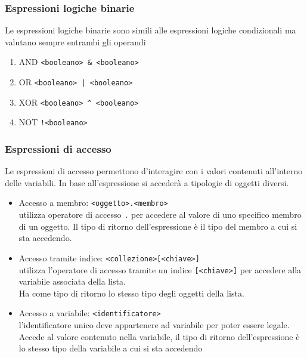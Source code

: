 \subsubsection{Espressioni logiche binarie}
Le espressioni logiche binarie sono simili alle espressioni logiche condizionali ma valutano sempre
entrambi gli operandi
\begin{enumerate}
    \item AND \lstinline|<booleano> & <booleano>|
    \item OR \lstinline=<booleano> | <booleano>=
    \item XOR \lstinline|<booleano> ^ <booleano>|
    \item NOT \lstinline|!<booleano>|
\end{enumerate}

\subsubsection{Espressioni di accesso}
Le espressioni di accesso permettono d'interagire con i valori contenuti all'interno delle variabili.
In base all'espressione si accederà a tipologie di oggetti diversi.

\begin{itemize}
    \item 
    {
        Accesso a membro: \lstinline|<oggetto>.<membro>| \\ 
        utilizza operatore di accesso \lstinline|.| per accedere
        al valore di uno specifico membro di un oggetto.
        Il tipo di ritorno dell'espressione è il tipo del membro a cui si sta accedendo.
    }
    \item 
    {
        Accesso tramite indice: \lstinline|<collezione>[<chiave>]| \\ 
        utilizza l'operatore di accesso tramite un indice
        \lstinline|[<chiave>]| per accedere alla variabile associata della lista. \\
        Ha come tipo di ritorno lo stesso tipo degli oggetti della lista.
    }
    \item 
    {
        Accesso a variabile: \lstinline|<identificatore>| \\ 
        l'identificatore unico deve appartenere ad variabile
        per poter essere legale. Accede al valore contenuto nella variabile, il tipo di ritorno dell'espressione
        è lo stesso tipo della variabile a cui si sta accedendo
    }
\end{itemize}

